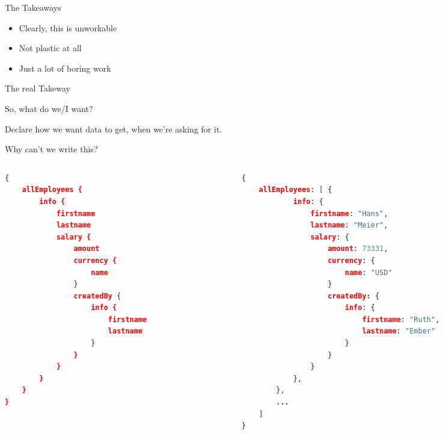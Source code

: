 \documentclass[aspectratio=169,notes]{beamer}
\begin{document}
	\begin{frame}[fragile]{The Takeaways}
		\Large
		\begin{itemize}
			\item Clearly, this is unworkable
			\item Not plastic at all
			\item Just a lot of boring work
		\end{itemize}
	\end{frame}

	\begin{frame}{The real Takeway}
		\begin{center}
		\end{center}
	\end{frame}

	\begin{frame}{So, what do we/I want?}
		\begin{center}
			\Large
			Declare how we want data to get, when we're asking for it.
		\end{center}
	\end{frame}

	\begin{frame}[fragile]{Why can't we write this?}
		\vspace{-7mm}	
		\begin{columns}[t]
			\begin{column}{0.5\textwidth}
				\begin{lstlisting}[language=json,basicstyle=\scriptsize\ttfamily]
{
	allEmployees {
		info {
			firstname
			lastname
			salary {
				amount
				currency {
					name
				}
				createdBy {
					info {
						firstname
						lastname
					}
				}
			}
		}
	}
}
\end{lstlisting}	
			\end{column}\pause
			\begin{column}{0.5\textwidth}
				\begin{lstlisting}[language=json,basicstyle=\scriptsize\ttfamily]
{
	allEmployees: [ { 
			info: {
				firstname: "Hans",
				lastname: "Meier",
				salary: {
					amount: 73331,
					currency: {
						name: "USD"
					}
					createdBy: {
						info: {
							firstname: "Ruth",
							lastname: "Ember"
						}
					}
				}
			},
		},
		...
	]
}
\end{lstlisting}	
			\end{column}
			
		\end{columns}
	\end{frame}
\end{document}
